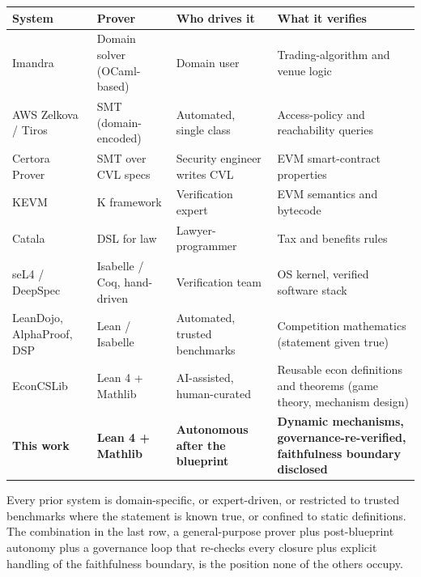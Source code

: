 \documentclass[
  11pt,
]{article}
\renewcommand{\_}{\origunderscore\allowbreak}
\begin{document}
{\footnotesize\setlength{\tabcolsep}{4pt}\begin{longtable}[]{@{}>{\raggedright\arraybackslash}p{}>{\raggedright\arraybackslash}p{}>{\raggedright\arraybackslash}p{}>{\raggedright\arraybackslash}p{}@{}}
\toprule\noalign{}
System & Prover & Who drives it & What it verifies \\
\midrule\noalign{}
\endhead
\bottomrule\noalign{}
\endlastfoot
Imandra & Domain solver (OCaml-based) & Domain user & Trading-algorithm
and venue logic \\
AWS Zelkova / Tiros & SMT (domain-encoded) & Automated, single class &
Access-policy and reachability queries \\
Certora Prover & SMT over CVL specs & Security engineer writes CVL & EVM
smart-contract properties \\
KEVM & K framework & Verification expert & EVM semantics and bytecode \\
Catala & DSL for law & Lawyer-programmer & Tax and benefits rules \\
seL4 / DeepSpec & Isabelle / Coq, hand-driven & Verification team & OS
kernel, verified software stack \\
LeanDojo, AlphaProof, DSP & Lean / Isabelle & Automated, trusted
benchmarks & Competition mathematics (statement given true) \\
EconCSLib & Lean 4 + Mathlib & AI-assisted, human-curated & Reusable
econ definitions and theorems (game theory, mechanism design) \\
\textbf{This work} & \textbf{Lean 4 + Mathlib} & \textbf{Autonomous
after the blueprint} & \textbf{Dynamic mechanisms,
governance-re-verified, faithfulness boundary disclosed} \\
\end{longtable}}

Every prior system is domain-specific, or expert-driven, or restricted
to trusted benchmarks where the statement is known true, or confined to
static definitions. The combination in the last row, a general-purpose
prover plus post-blueprint autonomy plus a governance loop that
re-checks every closure plus explicit handling of the faithfulness
boundary, is the position none of the others occupy.
\end{document}
